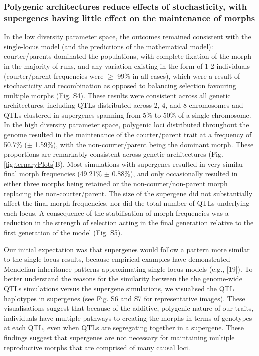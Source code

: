 \documentclass[
  11pt,
  a4paper,
]{article}
\begin{document}
\hypertarget{polygenic-architectures-reduce-effects-of-stochasticity-with-supergenes-having-little-effect-on-the-maintenance-of-morphs}{%
\subsubsection{Polygenic architectures reduce effects of stochasticity, with supergenes having little effect on the maintenance of morphs}\label{polygenic-architectures-reduce-effects-of-stochasticity-with-supergenes-having-little-effect-on-the-maintenance-of-morphs}}

In the low diversity parameter space, the outcomes remained consistent
with the single-locus model (and the predictions of the mathematical
model): courter/parents dominated the populations, with complete
fixation of the morph in the majority of runs, and any variation
existing in the form of 1-2 individuals (courter/parent frequencies were
\(\ge\) 99\% in all cases), which were a result of stochasticity and
recombination as opposed to balancing selection favouring multiple
morphs (Fig. S4). These results were consistent across all genetic
architectures, including QTLs distributed across 2, 4, and 8 chromosomes
and QTLs clustered in supergenes spanning from 5\% to 50\% of a single
chromosome. In the high diversity parameter space, polygenic loci
distributed throughout the genome resulted in the maintenance of the
courter/parent trait at a frequency of
50.7\%
(\(\pm\)
1.59\%),
with the non-courter/parent being the dominant morph. These proportions
are remarkably consistent across genetic architectures (Fig.
\ref{fig:ternaryPlots}B). Most simulations with supergenes resulted in
very similar final morph frequencies
(49.21\%
\(\pm\)
0.88\%),
and only occasionally resulted in either three morphs being retained or
the non-courter/non-parent morph replacing the non-courter/parent. The
size of the supergene did not substantially affect the final morph
frequencies, nor did the total number of QTLs underlying each locus. A
consequence of the stabilisation of morph frequencies was a reduction in
the strength of selection acting in the final generation relative to the
first generation of the model (Fig. S5).

Our initial expectation was that supergenes would follow a pattern more
similar to the single locus results, because empirical examples have
demonstrated Mendelian inheritance patterns approximating single-locus
models (e.g., {[}19{]}).
To better understand the reasons for the similarity between the the
genome-wide QTLs simulations versus the supergene simulations, we
visualised the QTL haplotypes in supergenes (see Fig. S6 and S7 for
representative images). These visualisations suggest that because of the
additive, polygenic nature of our traits, individuals have multiple
pathways to creating the morphs in terms of genotypes at each QTL, even
when QTLs are segregating together in a supergene. These findings
suggest that supergenes are not necessary for maintaining multiple
reproductive morphs that are comprised of many causal loci.
\end{document}
